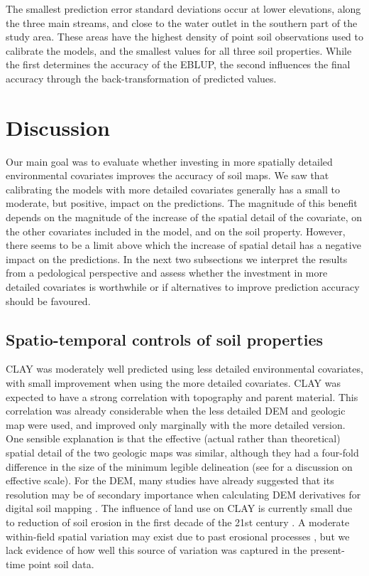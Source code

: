 The smallest prediction error standard deviations occur at lower elevations, along the three main streams, and 
close to the water outlet in the southern part of the study area. These areas have the highest density of point 
soil observations used to calibrate the models, and the smallest values for all three soil properties. While 
the first determines the accuracy of the EBLUP, the second influences the final accuracy through the 
back-transformation of predicted values.

\section{Discussion}

Our main goal was to evaluate whether investing in more spatially detailed environmental covariates improves 
the accuracy of soil maps. We saw that calibrating the models with more detailed covariates generally has a 
small to moderate, but positive, impact on the predictions. The magnitude of this benefit depends on the 
magnitude of the increase of the spatial detail of the covariate, on the other covariates included in the 
model, and on the soil property. However, there seems to be a limit above which the increase of spatial
detail has a negative impact on the predictions. In the next two subsections we interpret the results from a 
pedological perspective and assess whether the investment in more detailed covariates is worthwhile or if 
alternatives to improve prediction accuracy should be favoured.

\subsection{Spatio-temporal controls of soil properties}

CLAY was moderately well predicted using less detailed environmental covariates, with small improvement when 
using the more detailed covariates. CLAY was expected to have a strong correlation with topography and parent 
material. This correlation was already considerable when the less detailed DEM and geologic map were used, and 
improved only marginally with the more detailed version. One sensible explanation is that the effective (actual 
rather than theoretical) spatial detail of the two geologic maps was similar, although they had a four-fold 
difference in the size of the minimum legible delineation (see  for a discussion on 
effective scale). For the DEM, many studies have already suggested that its resolution may be of secondary 
importance when calculating DEM derivatives for digital soil mapping \cite{ZhuEtAl2008, BehrensEtAl2010a, 
MillerEtAl2015}. The influence of land use on CLAY is currently small due to reduction of soil erosion in the 
first decade of the 21st century \cite{MiguelEtAl2012, TenCatenEtAl2012b}. A moderate within-field spatial 
variation may exist due to past erosional processes \cite{MouraBueno2012}, but we lack evidence of how well 
this source of variation was captured in the present-time point soil data.

